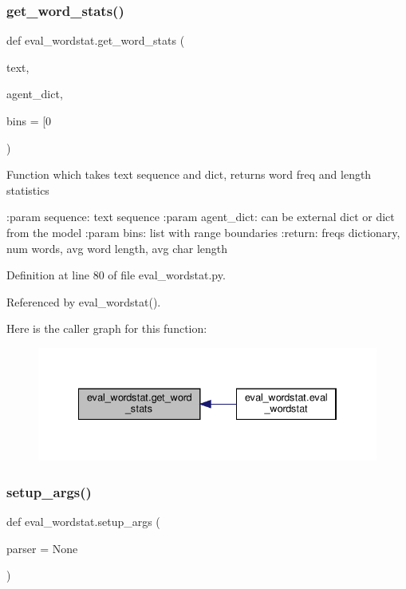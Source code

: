 \subsubsection{\texorpdfstring{get\+\_\+word\+\_\+stats()}{get\_word\_stats()}}
{\footnotesize\ttfamily def eval\+\_\+wordstat.\+get\+\_\+word\+\_\+stats (\begin{DoxyParamCaption}\item[{}]{text,  }\item[{}]{agent\+\_\+dict,  }\item[{}]{bins = {\ttfamily \mbox{[}0} }\end{DoxyParamCaption})}

\begin{DoxyVerb}Function which takes text sequence and dict, returns word freq and length statistics

:param sequence: text sequence
:param agent_dict: can be external dict or dict from the model
:param bins: list with range boundaries
:return: freqs dictionary, num words, avg word length, avg char length
\end{DoxyVerb}
 

Definition at line 80 of file eval\+\_\+wordstat.\+py.



Referenced by eval\+\_\+wordstat().

Here is the caller graph for this function\+:
\nopagebreak
\begin{figure}[H]
\begin{center}
\leavevmode
\includegraphics[width=334pt]{namespaceeval__wordstat_a2290cb39c5797675ac4020f96447c1ff_icgraph}
\end{center}
\end{figure}
\mbox{\label{namespaceeval__wordstat_a3872be823cf90eb2beb19e7aeb94a898}} 
\subsubsection{\texorpdfstring{setup\+\_\+args()}{setup\_args()}}
{\footnotesize\ttfamily def eval\+\_\+wordstat.\+setup\+\_\+args (\begin{DoxyParamCaption}\item[{}]{parser = {\ttfamily None} }\end{DoxyParamCaption})}



